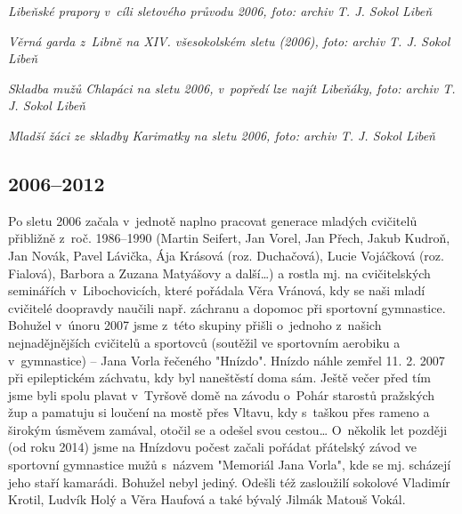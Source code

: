 \documentclass[a5paper, 12pt, twoside]{article}
\begin{document}

\textit{Libeňské prapory v~cíli sletového průvodu 2006, foto: archiv T. J.
Sokol Libeň}


\textit{Věrná garda z~Libně na XIV. všesokolském sletu (2006), foto:
archiv T. J. Sokol Libeň}


\textit{Skladba mužů Chlapáci na sletu 2006, v~popředí lze najít Libeňáky,
foto: archiv T. J. Sokol Libeň}


\textit{Mladší žáci ze skladby Karimatky na sletu 2006, foto: archiv T. J.
Sokol Libeň}

\subsection{2006--2012}

Po sletu 2006 začala v~jednotě naplno pracovat generace mladých
cvičitelů přibližně z~roč. 1986--1990 (Martin Seifert, Jan Vorel, Jan
Přech, Jakub Kudroň, Jan Novák, Pavel Lávička, Ája Krásová (roz.
Duchačová), Lucie Vojáčková (roz. Fialová), Barbora a Zuzana Matyášovy a
další\ldots) a rostla mj. na cvičitelských seminářích v~Libochovicích,
které pořádala Věra Vránová, kdy se naši mladí cvičitelé doopravdy
naučili např. záchranu a dopomoc při sportovní gymnastice. Bohužel
v~únoru 2007 jsme z~této skupiny přišli o~jednoho z~našich nejnadějnějších
cvičitelů a sportovců (soutěžil ve sportovním aerobiku a v~gymnastice)
-- Jana Vorla řečeného "Hnízdo". Hnízdo náhle zemřel 11. 2. 2007 při
epileptickém záchvatu, kdy byl naneštěstí doma sám. Ještě večer před tím
jsme byli spolu plavat v~Tyršově domě na závodu o~Pohár starostů
pražských žup a pamatuju si loučení na mostě přes Vltavu, kdy s~taškou
přes rameno a širokým úsměvem zamával, otočil se a odešel svou
cestou\ldots{} O~několik let později (od roku 2014) jsme na Hnízdovu
počest začali pořádat přátelský závod ve sportovní gymnastice mužů
s~názvem "Memoriál Jana Vorla", kde se mj. scházejí jeho staří kamarádi.
Bohužel nebyl jediný. Odešli též zasloužilí sokolové Vladimír Krotil,
Ludvík Holý a Věra Haufová a také bývalý Jilmák Matouš Vokál.

\end{document}
